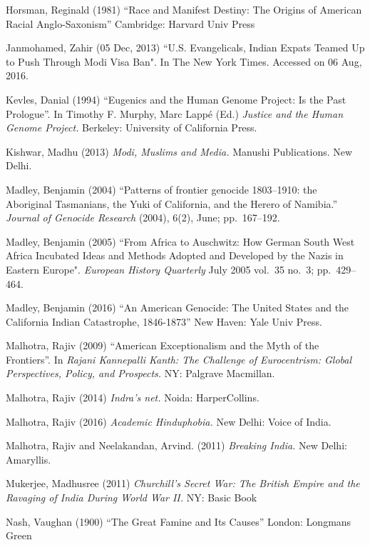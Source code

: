 \begin{thebibliography}{99}
Horsman, Reginald (1981) “Race and Manifest Destiny: The Origins of American Racial Anglo-Saxonism” Cambridge: Harvard Univ Press

Janmohamed, Zahir (05 Dec, 2013) “U.S. Evangelicals, Indian Expats Teamed Up to Push Through Modi Visa Ban". In The New York Times. Accessed on 06 Aug, 2016.

Kevles, Danial  (1994) “Eugenics and the Human Genome Project: Is the Past Prologue”. In Timothy F. Murphy, Marc Lappé (Ed.) {\sl Justice and the Human Genome Project.} Berkeley: University of California Press. 

Kishwar, Madhu (2013) {\sl Modi, Muslims and Media.} Manushi Publications. New Delhi.

Madley, Benjamin (2004) “Patterns of frontier genocide 1803--1910: the Aboriginal Tasmanians, the Yuki of California, and the Herero of Namibia.” {\sl Journal of Genocide Research} (2004), 6(2), June; pp.~167--192.

Madley, Benjamin (2005) “From Africa to Auschwitz: How German South West Africa Incubated Ideas and Methods Adopted and Developed by the Nazis in Eastern Europe". {\sl European History Quarterly} July 2005 vol.~35 no.~3; pp.~429--464.

Madley, Benjamin (2016) “An American Genocide: The United States and the California Indian Catastrophe, 1846-1873”  New Haven: Yale Univ Press.

Malhotra, Rajiv (2009) “American Exceptionalism and the Myth of the Frontiers”. In {\sl Rajani Kannepalli Kanth: The Challenge of Eurocentrism: Global Perspectives, Policy, and Prospects.} NY: Palgrave Macmillan.

Malhotra, Rajiv (2014) {\sl Indra’s net.} Noida: HarperCollins.

Malhotra, Rajiv (2016) {\sl Academic Hinduphobia.} New Delhi: Voice of India.

Malhotra, Rajiv and Neelakandan, Arvind. (2011) {\sl Breaking India.} New Delhi: Amaryllis. 

Mukerjee, Madhusree (2011) {\sl Churchill's Secret War: The British Empire and the Ravaging of India During World War II.} NY: Basic Book

Nash, Vaughan (1900) “The Great Famine and Its Causes” London: Longmans Green


\end{thebibliography}

